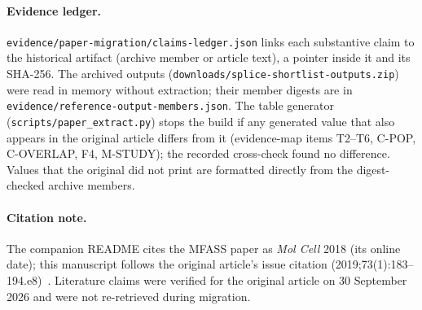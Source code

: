 \documentclass[11pt]{article}
\begin{document}
\paragraph{Evidence ledger.} \texttt{evidence/paper-migration/claims-ledger.json} links each substantive claim to the
historical artifact (archive member or article text), a pointer inside it and its SHA-256. The archived outputs
(\texttt{downloads/splice-shortlist-outputs.zip}) were read in memory without extraction; their member digests are in
\texttt{evidence/reference-output-members.json}. The table generator (\texttt{scripts/paper\_extract.py}) stops the build
if any generated value that also appears in the original article differs from it (evidence-map items T2--T6, C-POP,
C-OVERLAP, F4, M-STUDY); the recorded cross-check found no difference. Values that the original did not print are
formatted directly from the digest-checked archive members.

\paragraph{Citation note.} The companion README cites the MFASS paper as \emph{Mol Cell} 2018 (its online date); this
manuscript follows the original article's issue citation (2019;73(1):183--194.e8)~\citep{chong2019mfass}. Literature
claims were verified for the original article on 30 September 2026 and were not re-retrieved during migration.
\end{document}
